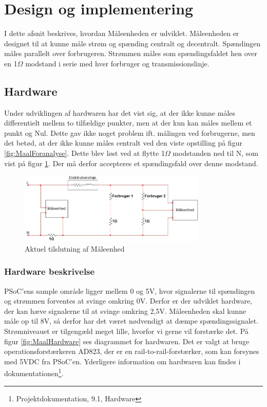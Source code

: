 
\section{Design og implementering}
I dette afsnit beskrives, hvordan Måleenheden er udviklet. Måleenheden er designet til at kunne måle strøm og spænding centralt og decentralt. Spændingen måles parallelt over forbrugeren. Strømmen måles som spændingsfaldet hen over en 1$\Omega$ modstand i serie med hver forbruger og transmissionslinje. 

\subsection{Hardware}

Under udviklingen af hardwaren har det vist sig, at der ikke kunne måles differentielt mellem to tilfældige punkter, men at der kun kan måles mellem et punkt og Nul. Dette gav ikke noget problem ift. målingen ved forbrugerne, men det betød, at der ikke kunne måles centralt ved den viste opstilling på figur \ref{fig:MaalForanalyse}. Dette blev løst ved at flytte 1$\Omega$ modstanden ned til N, som vist på figur \ref{fig:MaalAktuel}. Der må derfor accepteres et spændingsfald over denne modstand.

\begin{figure}[H] %
	\centering
	\includegraphics[width=0.8\textwidth]{figure/MaalAktuel}
	\caption{Aktuel tilslutning af Måleenhed}
	\label{fig:MaalAktuel}
\end{figure} 


\subsubsection{Hardware beskrivelse}
PSoC'ens sample område ligger mellem 0 og 5V, hvor signalerne til spændingen og strømmen forventes at svinge omkring 0V. Derfor er der udviklet hardware, der kan hæve signalerne til at svinge omkring 2,5V. Måleenheden skal kunne måle op til 8V, så derfor har det været nødvendigt at dæmpe spændingssignalet. Strømniveauet er tilgengæld meget lille, hvorfor vi gerne vil forstærke det. På figur \ref{fig:MaalHardware} ses diagrammet for hardwaren. Det er valgt at bruge operationsforstærkeren AD823, der er en rail-to-rail-forstærker, som kan forsynes med 5VDC fra PSoC'en. Yderligere information om hardwaren kan findes i dokumentationen\footnote{Projektdokumentation, 9.1, Hardware}.  
  

